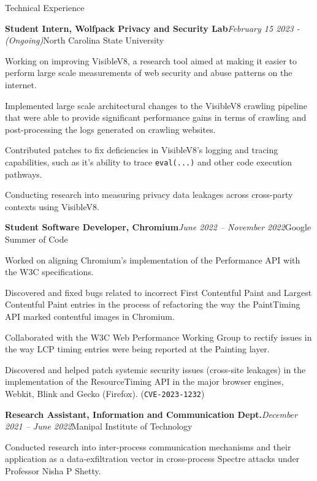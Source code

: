 \documentclass{resume} %
\begin{document}
\begin{rSection}{Technical Experience}
\begin{rSubsection}{\bf Student Intern, Wolfpack Privacy and Security Lab}{\em February 15 2023 - (Ongoing)}{North Carolina State University}{}
\item Working on improving VisibleV8, a research tool aimed at making it easier to perform large scale measurements of web security and abuse patterns on the internet.
\item Implemented large scale architectural changes to the VisibleV8 crawling pipeline that were able to provide significant performance gains in terms of crawling and post-processing the logs generated on crawling websites.
\item Contributed patches to fix deficiencies in VisibleV8's logging and tracing capabilities, such as it's ability to trace \texttt{eval(...)} and other code execution pathways.
\item Conducting research into measuring privacy data leakages across cross-party contexts using VisibleV8.
\end{rSubsection}
\begin{rSubsection}{\bf Student Software Developer, Chromium}{\em June 2022 -- November 2022}{Google Summer of Code}{}
\item Worked on aligning Chromium's implementation of the Performance API with the W3C specifications.
\item Discovered and fixed bugs related to incorrect First Contentful Paint and Largest Contentful Paint entries in the process of refactoring the way the PaintTiming API marked contentful images in Chromium.
\item Collaborated with the W3C Web Performance Working Group to rectify issues in the way LCP timing entries were being reported at the Painting layer.
\item Discovered and helped patch systemic security issues (cross-site leakages) in the implementation of the ResourceTiming API in the major browser engines, Webkit, Blink and Gecko (Firefox). (\texttt{CVE-2023-1232})
\end{rSubsection}
\begin{rSubsection}{\bf Research Assistant, Information and Communication Dept.}{\em December 2021 -- June 2022}{Manipal Institute of Technology}{}
\item Conducted research into inter-process communication mechanisms and their application as a data-exfiltration vector in cross-process Spectre attacks under Professor Nisha P Shetty.

\end{rSubsection}
\end{rSection}
\end{document}
